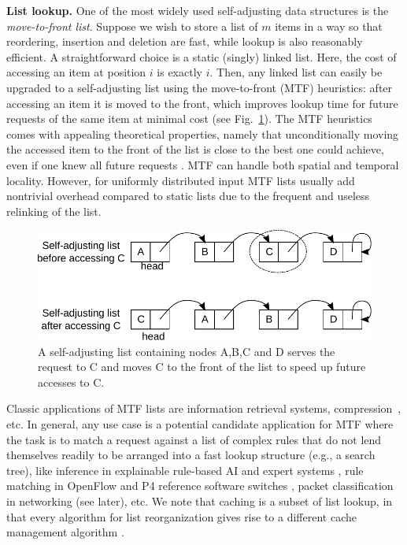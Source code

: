 \noindent%
\textbf{List lookup.} %
One of the most widely used self-adjusting data structures is the \emph{move-to-front list}. Suppose we wish to store a list of $m$ items in a way so that reordering, insertion and deletion are fast, while lookup is also reasonably efficient. A straightforward choice is a static (singly) linked list. Here, the cost of accessing an item at position $i$ is exactly $i$. Then, any linked list can easily be upgraded to a self-adjusting list using the move-to-front (MTF) heuristics: after accessing an item it is moved to the front, which improves lookup time for future requests of the same item at minimal cost (see Fig.~\ref{fig:mtf-example}). The MTF heuristics comes with appealing theoretical properties, namely that unconditionally moving the accessed item to the front of the list is close to the best one could achieve, even if one knew all future requests \cite{SleatorT85}. MTF can handle both spatial and temporal locality. However, for uniformly distributed input MTF lists usually add nontrivial overhead compared to static lists due to the frequent and useless relinking of the list.

\begin{figure}
  \centering
  \includegraphics[width=.85\linewidth]{fig/mtf.pdf}
  \caption{A self-adjusting list containing nodes A,B,C and D serves the request to C and moves C to the front of the list to speed up future accesses to C.}
  \label{fig:mtf-example}
\end{figure}

Classic applications of MTF lists are information retrieval systems, compression~\cite{BentleySTW86}, etc. In general, any use case is a potential candidate application for MTF where the task is to match a request against a list of complex rules that do not lend themselves readily to be arranged into a fast lookup structure (e.g., a search tree), like inference in explainable rule-based AI and expert systems \cite{dovsilovic2018explainable}, rule matching in OpenFlow and P4 reference software switches \cite{openflow}, packet classification in networking (see later), etc.  We note that caching is a subset of list lookup, in that every algorithm for list reorganization gives rise to a different cache management algorithm \cite{SleatorT85}.  

